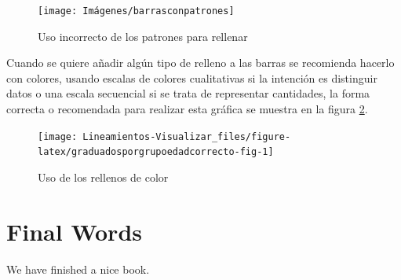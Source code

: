 \documentclass[
]{book}
\begin{document}
\begin{figure}

{\centering \texttt{[image: Imágenes/barrasconpatrones]} 

}

\caption{Uso incorrecto de los patrones para rellenar}\label{fig:barrasconpatrones-fig}
\end{figure}

Cuando se quiere añadir algún tipo de relleno a las barras se recomienda hacerlo con colores, usando escalas de colores cualitativas si la intención es distinguir datos o una escala secuencial si se trata de representar cantidades, la forma correcta o recomendada para realizar esta gráfica se muestra en la figura \ref{fig:graduadosporgrupoedadcorrecto-fig}.

\begin{figure}

{\centering \texttt{[image: Lineamientos-Visualizar\_files/figure-latex/graduadosporgrupoedadcorrecto-fig-1]} 

}

\caption{Uso de los rellenos de color}\label{fig:graduadosporgrupoedadcorrecto-fig}
\end{figure}

\hypertarget{final-words}{%
\chapter{Final Words}\label{final-words}}

We have finished a nice book.

  
\end{document}
